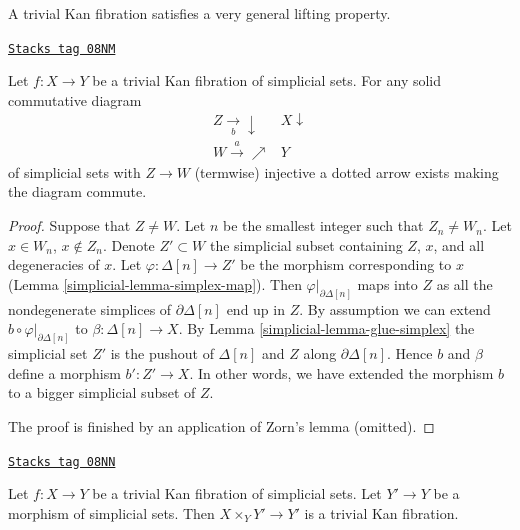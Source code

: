 A trivial Kan fibration satisfies a very general lifting property.

\begin{lemma}
\label{simplicial-lemma-trivial-kan}
\href{https://stacks.math.columbia.edu/tag/08NM}{\texttt{Stacks tag 08NM}}

Let $f : X \to Y$ be a trivial Kan fibration of simplicial sets.
For any solid commutative diagram
$$
\begin{array}{cc}Z \underset{b}{\longrightarrow}\downarrow & X \downarrow \\ W \overset{a}{\longrightarrow}\nearrow & Y\end{array}
$$
of simplicial sets with $Z \to W$ (termwise) injective
a dotted arrow exists making the diagram commute.
\end{lemma}

\begin{proof}

Suppose that $Z \not = W$. Let $n$ be the smallest integer such that
$Z_n \not = W_n$. Let $x \in W_n$, $x \not \in Z_n$. Denote
$Z' \subset W$ the simplicial subset containing $Z$, $x$, and
all degeneracies of $x$. Let
$\varphi : \Delta[n] \to Z'$ be the morphism corresponding to $x$
(Lemma \ref{simplicial-lemma-simplex-map}).
Then $\varphi|_{\partial \Delta[n]}$ maps into $Z$
as all the nondegenerate simplices of $\partial \Delta[n]$ end up in $Z$.
By assumption we can extend $b \circ \varphi|_{\partial \Delta[n]}$
to $\beta : \Delta[n] \to X$.
By Lemma \ref{simplicial-lemma-glue-simplex} the simplicial set $Z'$
is the pushout of $\Delta[n]$ and $Z$ along $\partial \Delta[n]$.
Hence $b$ and $\beta$ define a morphism $b' : Z' \to X$.
In other words, we have extended the morphism $b$ to a bigger
simplicial subset of $Z$.

\medskip\noindent
The proof is finished by an application of Zorn's lemma (omitted).
\end{proof}

\begin{lemma}
\label{simplicial-lemma-trivial-kan-base-change}
\href{https://stacks.math.columbia.edu/tag/08NN}{\texttt{Stacks tag 08NN}}

Let $f : X \to Y$ be a trivial Kan fibration of simplicial sets.
Let $Y' \to Y$ be a morphism of simplicial sets.
Then $X \times_Y Y' \to Y'$ is a trivial Kan fibration.
\end{lemma}

